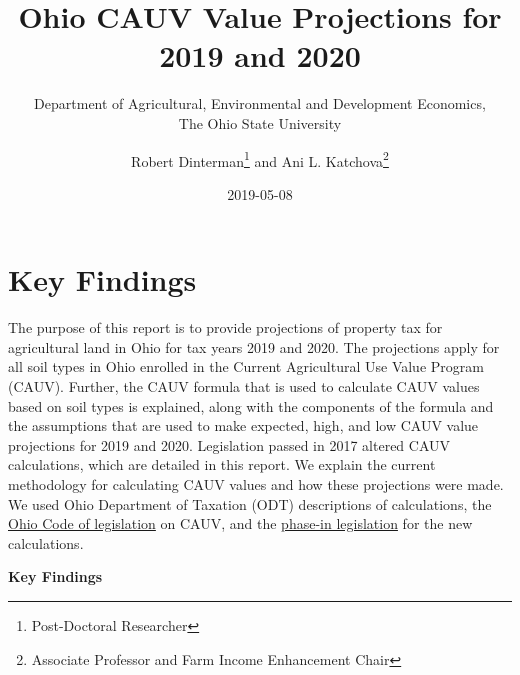 \documentclass[]{article}
\title{Ohio CAUV Value Projections for 2019 and 2020}
\subtitle{Department of Agricultural, Environmental and Development Economics,\\
The Ohio State University}
\author{Robert Dinterman\footnote{Post-Doctoral Researcher} and Ani L.
Katchova\footnote{Associate Professor and Farm Income Enhancement Chair}}
\date{2019-05-08}
\begin{document}
\maketitle

\hypertarget{key-findings}{%
\section{Key Findings}\label{key-findings}}

The purpose of this report is to provide projections of property tax for
agricultural land in Ohio for tax years 2019 and 2020. The projections
apply for all soil types in Ohio enrolled in the Current Agricultural
Use Value Program (CAUV). Further, the CAUV formula that is used to
calculate CAUV values based on soil types is explained, along with the
components of the formula and the assumptions that are used to make
expected, high, and low CAUV value projections for 2019 and 2020.
Legislation passed in 2017 altered CAUV calculations, which are detailed
in this report. We explain the current methodology for calculating CAUV
values and how these projections were made. We used Ohio Department of
Taxation (ODT) descriptions of calculations, the
\href{http://codes.ohio.gov/orc/5713.31}{Ohio Code of legislation} on
CAUV, and the \href{http://codes.ohio.gov/orc/5715.01}{phase-in
legislation} for the new calculations.

\textbf{Key Findings}
\end{document}
